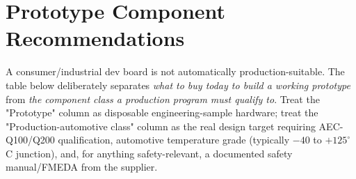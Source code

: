 \section{Prototype Component Recommendations}
\label{sec:bom}

\begin{risknote}[title={Read this before the table}]
A consumer/industrial dev board is not automatically production-suitable. The table below deliberately separates \emph{what to buy today to build a working prototype} from \emph{the component class a production program must qualify to}. Treat the "Prototype" column as disposable engineering-sample hardware; treat the "Production-automotive class" column as the real design target requiring AEC-Q100/Q200 qualification, automotive temperature grade (typically $-40$ to $+125^\circ$C junction), and, for anything safety-relevant, a documented safety manual/FMEDA from the supplier.
\end{risknote}

